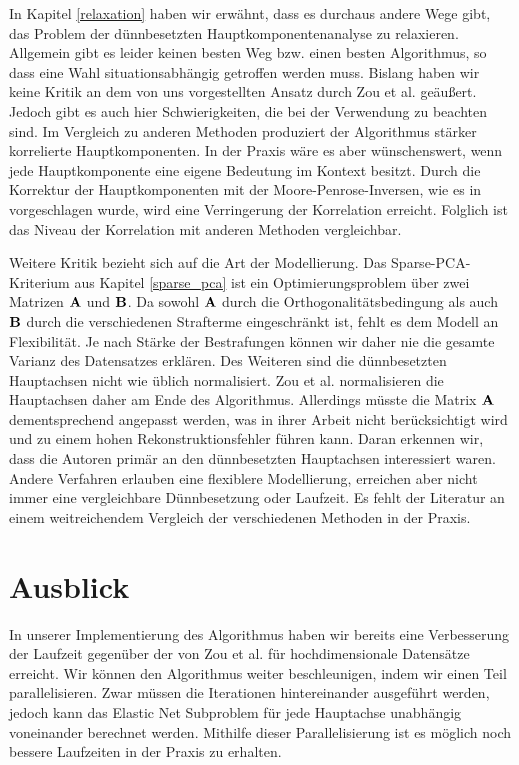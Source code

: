 In Kapitel \ref{relaxation} haben wir erwähnt, dass es durchaus andere Wege gibt, das Problem der dünnbesetzten Hauptkomponentenanalyse zu relaxieren. Allgemein gibt es leider keinen besten Weg bzw. einen besten Algorithmus, so dass eine Wahl situationsabhängig getroffen werden muss. Bislang haben wir keine Kritik an dem von uns vorgestellten Ansatz durch Zou et al. \cite{zou_sparsepca} geäußert. Jedoch gibt es auch hier Schwierigkeiten, die bei der Verwendung zu beachten sind. Im Vergleich zu anderen Methoden produziert der Algorithmus stärker korrelierte Hauptkomponenten. In der Praxis wäre es aber wünschenswert, wenn jede Hauptkomponente eine eigene Bedeutung im Kontext besitzt. Durch die Korrektur der Hauptkomponenten mit der Moore-Penrose-Inversen, wie es in \cite{camacho} vorgeschlagen wurde, wird eine Verringerung der Korrelation erreicht. Folglich ist das Niveau der Korrelation mit anderen Methoden vergleichbar. 

Weitere Kritik bezieht sich auf die Art der Modellierung. Das Sparse-PCA-Kriterium aus Kapitel \ref{sparse_pca} ist ein Optimierungsproblem über zwei Matrizen $\mathbf{A}$ und $\mathbf{B}$. Da sowohl $\mathbf{A}$ durch die Orthogonalitätsbedingung als auch $\mathbf{B}$ durch die verschiedenen Strafterme eingeschränkt ist, fehlt es dem Modell an Flexibilität. Je nach Stärke der Bestrafungen können wir daher nie die gesamte Varianz des Datensatzes erklären. Des Weiteren sind die dünnbesetzten Hauptachsen nicht wie üblich normalisiert. Zou et al. normalisieren die Hauptachsen daher am Ende des Algorithmus. Allerdings müsste die Matrix $\mathbf{A}$ dementsprechend angepasst werden, was in ihrer Arbeit nicht berücksichtigt wird und zu einem hohen Rekonstruktionsfehler führen kann. Daran erkennen wir, dass die Autoren primär an den dünnbesetzten Hauptachsen interessiert waren. Andere Verfahren erlauben eine flexiblere Modellierung, erreichen aber nicht immer eine vergleichbare Dünnbesetzung oder Laufzeit. Es fehlt der Literatur an einem weitreichendem Vergleich der verschiedenen Methoden in der Praxis.




\section{Ausblick}

In unserer Implementierung des Algorithmus haben wir bereits eine Verbesserung der Laufzeit gegenüber der von Zou et al. für hochdimensionale Datensätze erreicht. Wir können den Algorithmus weiter beschleunigen, indem wir einen Teil parallelisieren. Zwar müssen die Iterationen hintereinander ausgeführt werden, jedoch kann das Elastic Net Subproblem für jede Hauptachse unabhängig voneinander berechnet werden. Mithilfe dieser Parallelisierung ist es möglich noch bessere Laufzeiten in der Praxis zu erhalten.

